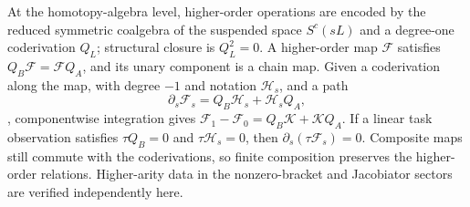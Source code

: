 \documentclass[11pt,a4paper]{article}
\theoremstyle{plain}
\theoremstyle{definition}
\theoremstyle{remark}
\begin{document}
\begin{CJK*}
At the homotopy-algebra level, higher-order operations are encoded by the reduced symmetric coalgebra of the suspended space $S^c(sL)$ and a degree-one coderivation $Q_L$; structural closure is $Q_L^2=0$. A higher-order map $\mathcal F$ satisfies $Q_B\mathcal F=\mathcal FQ_A$, and its unary component is a chain map. Given a coderivation along the map, with degree $-1$ and notation $\mathcal H_s$, and a path
\[
 \partial_s\mathcal F_s=Q_B\mathcal H_s+\mathcal H_sQ_A,
\],
componentwise integration gives $\mathcal F_1-\mathcal F_0=Q_B\mathcal K+\mathcal KQ_A$. If a linear task observation satisfies $\tau Q_B=0$ and $\tau\mathcal H_s=0$, then $\partial_s(\tau\mathcal F_s)=0$. Composite maps still commute with the coderivations, so finite composition preserves the higher-order relations. Higher-arity data in the nonzero-bracket and Jacobiator sectors are verified independently here.


\end{CJK*}
\end{document}
